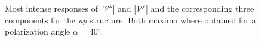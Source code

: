 \documentclass[prb,11pt,tightenlines,twocolumn,aps]{revtex4-1}
\begin{document}
\begin{figure}[tb]
    \centering
    \\
    \caption{Most intense responses of $|\mathcal{V}^{\mathrm{x}}|$ and
    $|\mathcal{V}^{\mathrm{y}}|$ and the corresponding three components for the
    \emph{up} structure. Both maxima where obtained for a polarization
    angle $\alpha=40^{\circ}$. }
    \label{fig:up-vab-comp-rtp-1}
\end{figure}
\end{document}
